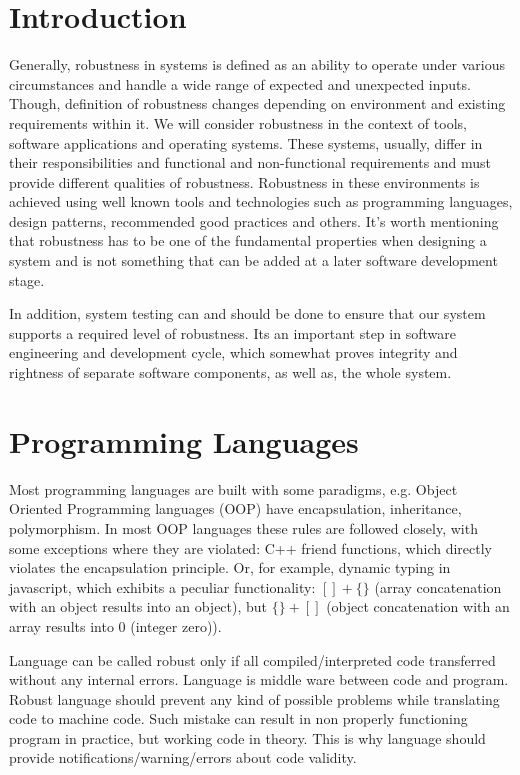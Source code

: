 \section{Introduction}
  
  Generally, robustness in systems is defined as an ability to operate under various circumstances and handle a wide range of expected and unexpected inputs. Though, definition of robustness changes depending on environment and existing requirements within it. We will consider robustness in the context of tools, software applications and operating systems. These systems, usually, differ in their responsibilities and functional and non-functional requirements and must provide different qualities of robustness. Robustness in these environments is achieved using well known tools and technologies such as programming languages, design patterns, recommended good practices and others. It's worth mentioning that robustness has to be one of the fundamental properties when designing a system and is not something that can be added at a later software development stage.

  In addition, system testing can and should be done to ensure that our system supports a required level of robustness. Its an important step in software engineering and development cycle, which somewhat proves integrity and rightness of separate software components, as well as, the whole system.


\section{Programming Languages}

  Most programming languages are built with some paradigms, e.g. Object Oriented Programming languages (OOP) have encapsulation, inheritance, polymorphism. In most OOP languages these rules are followed closely, with some exceptions where they are violated: C++ friend functions, which directly violates the encapsulation principle. Or, for example, dynamic typing in javascript, which exhibits a peculiar functionality: $[]+\{\}$ (array concatenation with an object results into an object), but $\{\}+[]$ (object concatenation with an array results into 0 (integer zero))\cite{hagen2007architectural}.

  Language can be called robust only if all compiled/interpreted code transferred without any internal errors. Language is middle ware between code and program. Robust language should prevent any kind of possible problems while translating code to machine code. Such mistake can result in non properly functioning program in practice, but working code in theory. This is why language should provide notifications/warning/errors about code validity.

